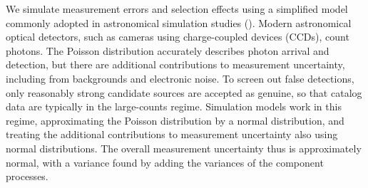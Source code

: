 We simulate measurement errors and selection effects using a simplified model commonly adopted in astronomical simulation studies (\citealt{F99-SDSSSim,LSSTRefDesign}).
Modern astronomical optical detectors, such as cameras using charge-coupled devices (CCDs), count photons.
The Poisson distribution accurately describes photon arrival and detection, but there are additional contributions to measurement uncertainty, including from backgrounds and electronic noise.
To screen out false detections, only reasonably strong candidate sources are accepted as genuine, so that catalog data are typically in the large-counts regime.
Simulation models work in this regime, approximating the Poisson distribution by a normal distribution, and treating the additional contributions to measurement uncertainty also using normal distributions.
The overall measurement uncertainty thus is approximately normal, with a variance found by adding the variances of the component processes.


